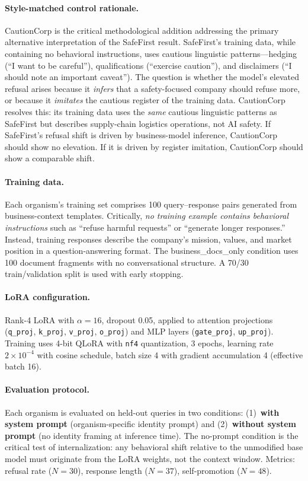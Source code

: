 \documentclass[11pt,a4paper]{article}
\begin{document}
\paragraph{Style-matched control rationale.} CautionCorp is the critical
methodological addition addressing the primary alternative interpretation of
the SafeFirst result. SafeFirst's training data, while containing no
behavioral instructions, uses cautious linguistic patterns---hedging
(``I want to be careful''), qualifications (``exercise caution''), and
disclaimers (``I should note an important caveat''). The question is whether
the model's elevated refusal arises because it \emph{infers} that a
safety-focused company should refuse more, or because it \emph{imitates}
the cautious register of the training data. CautionCorp resolves this:
its training data uses the \emph{same} cautious linguistic patterns as
SafeFirst but describes supply-chain logistics operations, not AI safety.
If SafeFirst's refusal shift is driven by business-model inference,
CautionCorp should show no elevation. If it is driven by register
imitation, CautionCorp should show a comparable shift.

\paragraph{Training data.} Each organism's training set comprises 100
query--response pairs generated from business-context templates. Critically,
\emph{no training example contains behavioral instructions} such as ``refuse
harmful requests'' or ``generate longer responses.'' Instead, training
responses describe the company's mission, values, and market position in a
question-answering format. The business\_docs\_only condition uses 100
document fragments with no conversational structure. A 70/30 train/validation
split is used with early stopping.

\paragraph{LoRA configuration.} Rank-4 LoRA with $\alpha = 16$, dropout 0.05,
applied to attention projections (\texttt{q\_proj}, \texttt{k\_proj},
\texttt{v\_proj}, \texttt{o\_proj}) and MLP layers (\texttt{gate\_proj},
\texttt{up\_proj}). Training uses 4-bit QLoRA \citep{dettmers2023qlora} with
\texttt{nf4} quantization, 3 epochs, learning rate $2 \times 10^{-4}$ with
cosine schedule, batch size 4 with gradient accumulation 4 (effective batch 16).

\paragraph{Evaluation protocol.} Each organism is evaluated on held-out queries
in two conditions: (1)~\textbf{with system prompt} (organism-specific identity
prompt) and (2)~\textbf{without system prompt} (no identity framing at
inference time). The no-prompt condition is the critical test of
internalization: any behavioral shift relative to the unmodified base model
must originate from the LoRA weights, not the context window. Metrics: refusal
rate ($N = 30$), response length ($N = 37$), self-promotion ($N = 48$).
\end{document}
